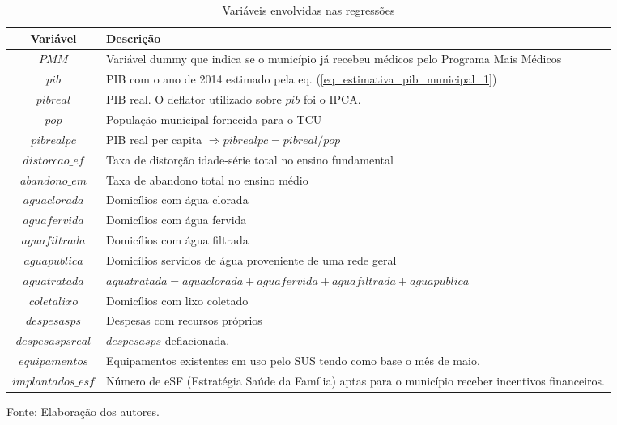 \documentclass[twoside,onecolumn,12pt]{article}
\numberwithin{outputctr}{section}
\begin{document}
\begin{table}[!htb]\centering \caption{Vari\'{a}veis envolvidas nas regress\~{o}es \label{tabVariaveis}}
\begin{tabular}{|c|p{12cm}|}\hline\hline
\textbf{Vari\'{a}vel} & \textbf{Descri\c{c}\~{a}o} \\ \hline
$PMM$ & Vari\'{a}vel dummy que indica se o munic\'{i}pio j\'{a} recebeu m\'{e}dicos pelo Programa Mais M\'{e}dicos \\ \hline
$pib$ & PIB com o ano de 2014 estimado pela eq. (\ref{eq_estimativa_pib_municipal_1}) \\ \hline
$pibreal$ & PIB real. O deflator utilizado sobre $pib$ foi o IPCA. \\ \hline
$pop$ & Popula\c{c}\~{a}o municipal fornecida para o TCU \\ \hline
$pibrealpc$ & PIB real per capita $\Rightarrow pibrealpc = pibreal / pop$ \\ \hline
$distorcao\_ef$ & Taxa de distor\c{c}\~{a}o idade-s\'{e}rie total no ensino fundamental \\ \hline
$abandono\_em$ & Taxa de abandono total no ensino m\'{e}dio \\ \hline
$aguaclorada$ & Domic\'{i}lios com \'{a}gua clorada \\ \hline
$aguafervida$ & Domic\'{i}lios com \'{a}gua fervida \\ \hline
$aguafiltrada$ & Domic\'{i}lios com \'{a}gua filtrada \\ \hline
$aguapublica$ & Domic\'{i}lios servidos de \'{a}gua proveniente de uma rede geral \\ \hline
$aguatratada$ & $aguatratada = aguaclorada + aguafervida + aguafiltrada + aguapublica$ \\ \hline
$coletalixo$ & Domic\'{i}lios com lixo coletado \\ \hline
$despesasps$ & Despesas com recursos pr\'{o}prios \\ \hline
$despesaspsreal$ & $despesasps$ deflacionada. \\ \hline
$equipamentos$ & Equipamentos existentes em uso pelo SUS tendo como base o m\^{e}s de maio. \\ \hline
$implantados\_esf$ & N\'{u}mero de eSF (Estrat\'{e}gia Sa\'{u}de da Fam\'{i}lia) aptas para o munic\'{i}pio receber incentivos financeiros. \\
\hline
\end{tabular}
\begin{tablenotes}
\item \tiny{Fonte: Elaboração dos autores.}
\end{tablenotes}
\end{table}
\end{document}
